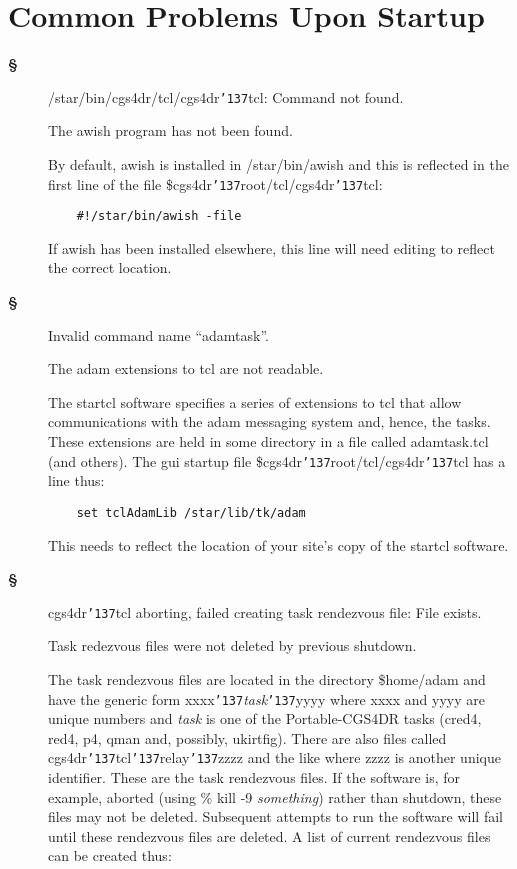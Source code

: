 \documentclass[a4paper]{book}
\renewcommand{\_}{{\tt\char'137}}
\begin{document}
\section{Common Problems Upon Startup}
\begin{description}
\item[{\bf \S}] {\sf /star/bin/cgs4dr/tcl/cgs4dr\_tcl: Command not found.}

  The awish program has not been found.

  By default, awish is installed in /star/bin/awish and this is reflected
  in the first line of the file {\sc \$cgs4dr\_root}/tcl/cgs4dr\_tcl:
  \begin{verbatim}
    #!/star/bin/awish -file
  \end{verbatim}
  If awish has been installed elsewhere, this line will need editing to reflect
  the correct location.

\item[{\bf \S}] {\sf Invalid command name ``adamtask''.}

  The {\sc adam} extensions to tcl are not readable.

  The {\sc startcl} software specifies a series of extensions to tcl that allow
  communications with the {\sc adam} messaging system and, hence, the tasks. These
  extensions are held in some directory in a file called adamtask.tcl (and others).
  The {\sc gui} startup file {\sc \$cgs4dr\_root}/tcl/cgs4dr\_tcl has a line thus:
  \begin{verbatim}
    set tclAdamLib /star/lib/tk/adam
  \end{verbatim}
  This needs to reflect the location of your site's copy of the {\sc startcl} software.

\item[{\bf \S}] {\sf cgs4dr\_tcl aborting, failed creating task rendezvous file: File exists.}

  Task redezvous files were not deleted by previous shutdown.

  The task rendezvous files are located in the directory {\sc \$home}/adam and have the generic form
  {\sf xxxx}\_{\em task}\_{\sf yyyy} where {\sf xxxx} and {\sf yyyy} are unique numbers
  and {\em task} is one of the Portable-CGS4DR tasks (cred4, red4, p4, qman and, possibly, ukirtfig).
  There are also files called cgs4dr\_tcl\_relay\_{\sf zzzz} and the like where {\sf zzzz}
  is another unique identifier. These are the task rendezvous files. If the software is,
  for example, aborted (using \% kill -9 {\em something}) rather than shutdown, these files may not be deleted.
  Subsequent attempts to run the software will fail until these rendezvous files are
  deleted. A list of current rendezvous files can be created thus:


\end{description}
\end{document}

